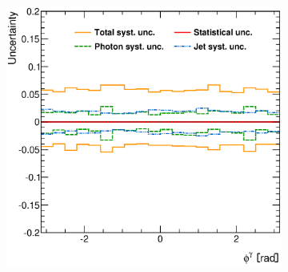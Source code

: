 \documentclass[12pt, twoside]{article}
\numberwithin{equation}{section}
\numberwithin{figure}{section}
\newenvironment{changemargin}[2]{%
\begin{list}{}{%
\setlength{\topsep}{0pt}%
\setlength{\leftmargin}{#1}%
\setlength{\rightmargin}{#2}%
\setlength{\listparindent}{\parindent}%
\setlength{\itemindent}{\parindent}%
\setlength{\parsep}{\parskip}%
}%
\item[]}{\end{list}}
\begin{document}
\begin{figure}
\begin{changemargin}{-1.0cm}{-0.75cm}
\begin{changemargin}{-0.75cm}{-1.0cm}
\begin{subfigure}[b]{0.37\textwidth}
            \subcaption{}
            \label{fig:SystUncerEtaPhoton}
        \end{subfigure}
        \begin{subfigure}[b]{0.37\textwidth}
            \includegraphics[width=\textwidth]{./images/TotalSystematicUncertainty/TOT_SYST-103.eps}
            \subcaption{}
            \label{fig:SystUncerPhiPhoton}
        \end{subfigure}


\end{changemargin}
\end{changemargin}
\end{figure}
\end{document}
